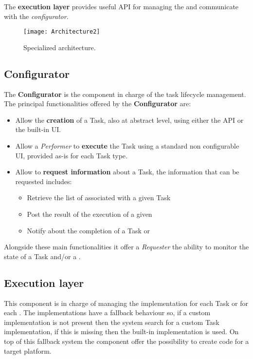 The \textbf{execution layer} provides useful API for managing the \utask{} and
communicate with the \emph{configurator}.

\begin{figure}[tb]
	\centering
	\texttt{[image: Architecture2]}
	\caption{Specialized architecture.}
	\label{fig:architecture2}
\end{figure}





\subsection{Configurator}
The \textbf{Configurator} is the component in charge of the task lifecycle
management. The principal functionalities offered by the \textbf{Configurator}
are:
\begin{itemize}
	\item Allow the \textbf{creation} of a Task, also at abstract level, using
	either the API or the built-in UI.

	\item Allow a \emph{Performer} to \textbf{execute} the Task using a standard
	non configurable UI, provided as-is for each Task type.

	\item Allow to \textbf{request information} about a Task, the information
	that can be requested includes:
	\begin{itemize}
		\item Retrieve the list of \utask{} associated with a given Task

		\item Post the result of the execution of a given \utask{}

		\item Notify about the completion of a Task or \utask{}
	\end{itemize}
\end{itemize}

Alongside these main functionalities it offer a \emph{Requester} the ability to
monitor the state of a Task and/or a \utask{}.




\subsection{Execution layer}
This component is in charge of managing the \utask{} implementation for each Task
or for each \utask{}. The implementations have a fallback behaviour so, if a
custom \utask{} implementation is not present then the system search for a
custom Task implementation, if this is missing then the built-in implementation
is used. On top of this fallback system the component offer the possibility to
create code for a target platform.

